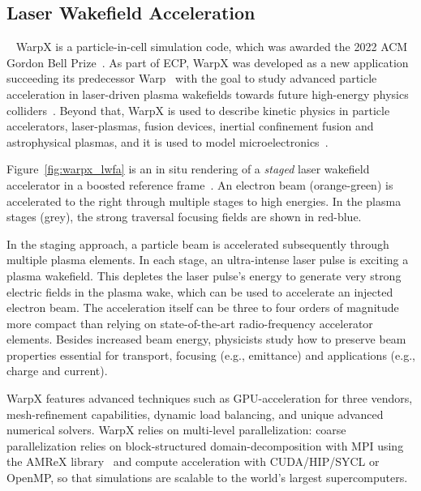 \subsection{Laser Wakefield Acceleration}\label{sec:warpx}

~%
%
%
WarpX is a particle-in-cell simulation code, which was awarded the 2022 ACM Gordon Bell Prize~\cite{FedeliHuebl2022}.
As part of ECP, WarpX was developed as a new application succeeding its predecessor Warp~\cite{Vay2013} with the goal to study advanced particle acceleration in laser-driven plasma wakefields towards future high-energy physics colliders~\cite{Albert2021}.
Beyond that, WarpX is used to describe kinetic physics in particle accelerators, laser-plasmas, fusion devices, inertial confinement fusion and astrophysical plasmas, and it is used to model microelectronics~\cite{Yao2022}.

Figure~\ref{fig:warpx_lwfa} is an in situ rendering of a \emph{staged} laser wakefield accelerator in a boosted reference frame~\cite{Vay2011}.
An electron beam (orange-green) is accelerated to the right through multiple stages to high energies.
In the plasma stages (grey), the strong traversal focusing fields are shown in red-blue.

In the staging approach, a particle beam is accelerated subsequently through multiple plasma elements.
In each stage, an ultra-intense laser pulse is exciting a plasma wakefield.
This depletes the laser pulse's energy to generate very strong electric fields in the plasma wake, which can be used to accelerate an injected electron beam.
The acceleration itself can be three to four orders of magnitude more compact than relying on state-of-the-art radio-frequency accelerator elements.
Besides increased beam energy, physicists study how to preserve beam properties essential for transport, focusing (e.g., emittance) and applications (e.g., charge and current).

WarpX features advanced techniques such as GPU-acceleration for three vendors, mesh-refinement capabilities, dynamic load balancing, and unique advanced numerical solvers.
WarpX relies on multi-level parallelization: coarse parallelization relies on block-structured domain-decomposition with MPI using the AMReX library~\cite{Zhang2019} and compute acceleration with CUDA/HIP/SYCL or OpenMP, so that simulations are scalable to the world's largest supercomputers.

